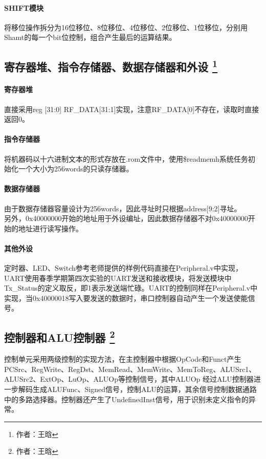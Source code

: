 \documentclass{article}
\begin{document}
            \paragraph*{SHIFT模块}
            将移位操作拆分为16位移位、8位移位、4位移位、2位移位、1位移位，分别用Shamt的每一个bit位控制，组合产生最后的运算结果。

        \subsection{寄存器堆、指令存储器、数据存储器和外设 \protect\footnote{作者：王晗}}
            \paragraph*{寄存器堆}
                直接采用reg [31:0] RF\_DATA[31:1]实现，注意RF\_DATA[0]不存在，读取时直接返回0。
            \paragraph*{指令存储器}
                将机器码以十六进制文本的形式存放在.rom文件中，使用\$readmemh系统任务初始化一个大小为256words的只读存储器。
            \paragraph*{数据存储器}
                由于数据存储器容量设计为256words，因此寻址时只根据address[9:2]寻址。 \\
                另外，0x40000000开始的地址用于外设编址，因此数据存储器不对0x40000000开始的地址进行读写操作。
            \paragraph*{其他外设}
                定时器、LED、Switch参考老师提供的样例代码直接在Peripheral.v中实现，UART使用春季学期第四次实验的UART发送和接收模块，将发送模块中Tx\_Status的定义取反，即1表示发送端忙碌。UART的控制同样在Peripheral.v中实现，当0x40000018写入要发送的数据时，串口控制器自动产生一个发送使能信号。

        \subsection{控制器和ALU控制器 \protect\footnote{作者：王晗}}
            控制单元采用两级控制的实现方法，在主控制器中根据OpCode和Funct产生PCSrc、RegWrite、RegDst、MemRead、MemWrite、MemToReg、ALUSrc1、ALUSrc2、ExtOp、LuOp、ALUOp等控制信号，其中ALUOp 经过ALU控制器进一步解码生成ALUFunc、Signed信号，控制ALU的运算，其余信号控制数据通路中的多路选择器。控制器还产生了UndefinedInst信号，用于识别未定义指令的异常。
\end{document}
